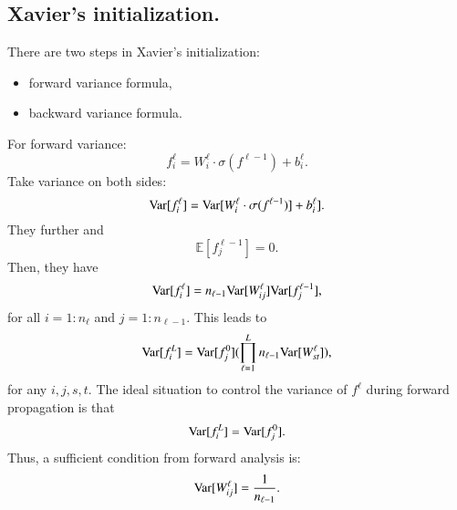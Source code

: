 \subsection{Xavier's initialization.} There are two steps in Xavier's initialization:
\begin{itemize}
	\item forward variance formula,
	\item backward variance formula.
\end{itemize}
For forward variance:
\begin{equation}\label{key}
f^\ell_i = W^\ell_i \cdot \sigma(f^{\ell-1}) + b^\ell_i.
\end{equation}
Take variance on both sides:
\begin{equation}\label{key}
{\rm Var}[ f^\ell_i ] = {\rm Var}[W^\ell_i \cdot \sigma(f^{\ell-1})]+ b^\ell _i].
\end{equation}
They further  and
\begin{equation}\label{key}
\mathbb{E}[ f^{\ell-1}_j] = 0.
\end{equation}
Then, they have
\begin{equation}\label{key}
{\rm Var}[ f^\ell_i ]  = n_{\ell-1}{\rm Var}[W^\ell_{ij}] {\rm Var}[f^{\ell-1}_j], 
\end{equation}
for all $i=1:n_\ell$ and $j = 1:n_{\ell-1}$.
This leads to
\begin{equation}\label{key}
{\rm Var}[ f^L_i ]  = {\rm Var}[f^{0}_j] (\prod_{\ell=1}^L n_{\ell-1}{\rm Var}[W^\ell_{st}] ),
\end{equation}
for any $i,j,s,t$.
The ideal situation to control the variance of $f^{\ell}$ during forward propagation is that
\begin{equation}\label{key}
{\rm Var}[ f^L_i ] =  {\rm Var}[f^{0}_j].
\end{equation}
Thus, a sufficient condition from forward analysis is:
\begin{equation}\label{key}
{\rm Var}[W^\ell_{ij}] = \frac{1}{n_{\ell-1}}.
\end{equation}

